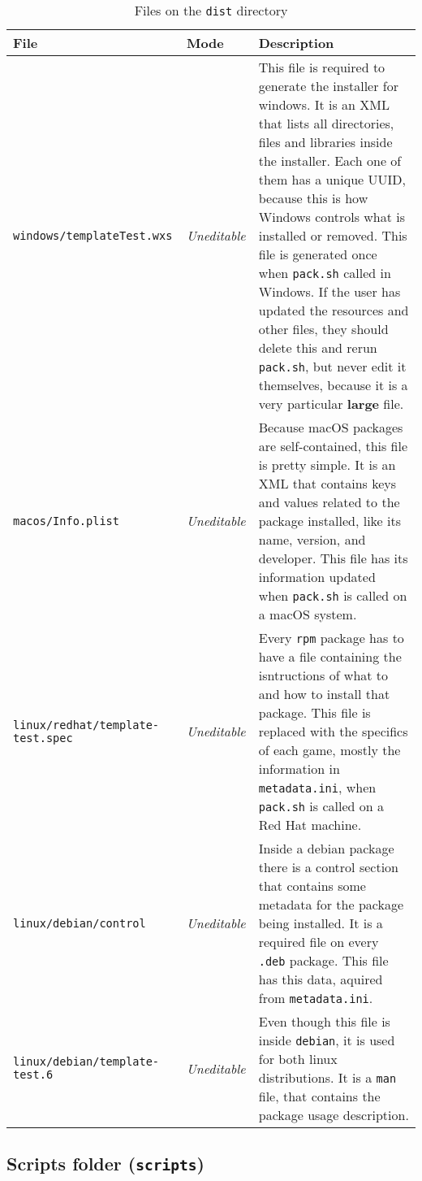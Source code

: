 \begin{longtabu} to \linewidth {XlX}

\caption{Files on the \texttt{dist} directory}\label{tab:files_dist_dir}\\
\toprule
\textbf{File} & \textbf{Mode} & \textbf{Description} \\
\midrule
\endhead

\texttt{windows/templateTest.wxs} & \textit{Uneditable} & This file is required to generate the installer for windows. It is an XML that lists all directories, files and libraries inside the installer. Each one of them has a unique UUID, because this is how Windows controls what is installed or removed. This file is generated once when \texttt{pack.sh} called in Windows. If the user has updated the resources and other files, they should delete this and rerun \texttt{pack.sh}, but never edit it themselves, because it is a very particular \textbf{large} file. \\ \hline
\texttt{macos/Info.plist} & \textit{Uneditable} & Because macOS packages are self-contained, this file is pretty simple. It is an XML that contains keys and values related to the package installed, like its name, version, and developer. This file has its information updated when \texttt{pack.sh} is called on a macOS system. \\ \hline
\texttt{linux/redhat/template-test.spec} & \textit{Uneditable} & Every \texttt{rpm} package has to have a file containing the isntructions of what to and how to install that package. This file is replaced with the specifics of each game, mostly the information in \texttt{metadata.ini}, when \texttt{pack.sh} is called on a Red Hat machine. \\ \hline
\texttt{linux/debian/control} & \textit{Uneditable} & Inside a debian package there is a control section that contains some metadata for the package being installed. It is a required file on every \texttt{.deb} package. This file has this data, aquired from \texttt{metadata.ini}. \\ \hline
\texttt{linux/debian/template-test.6} & \textit{Uneditable} & Even though this file is inside \texttt{debian}, it is used for both linux distributions. It is a \texttt{man} file, that contains the package usage description. \\
\bottomrule
\end{longtabu}




\subsection{Scripts folder (\texttt{scripts})}
\label{sec:scripts_folder}

